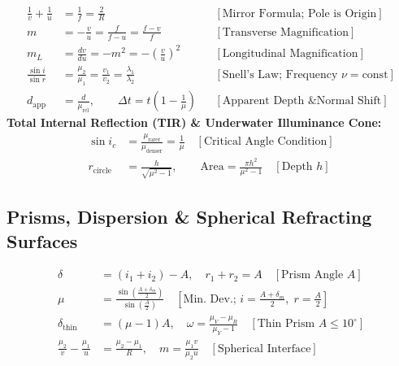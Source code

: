 \documentclass[10pt,twoside,openright]{book}
\begin{document}
\begin{formulabox}
\begin{align}
  \frac{1}{v} + \frac{1}{u} &= \frac{1}{f} = \frac{2}{R} && [\text{Mirror Formula; Pole is Origin}] \\
  m &= -\frac{v}{u} = \frac{f}{f - u} = \frac{f - v}{f} && [\text{Transverse Magnification}] \\
  m_L &= \frac{dv}{du} = -m^2 = -\left(\frac{v}{u}\right)^2 && [\text{Longitudinal Magnification}] \\
  \frac{\sin i}{\sin r} &= \frac{\mu_2}{\mu_1} = \frac{v_1}{v_2} = \frac{\lambda_1}{\lambda_2} && [\text{Snell's Law; Frequency } \nu = \text{const}] \\
  d_{\text{app}} &= \frac{d}{\mu_{\text{rel}}}, \qquad \Delta t = t\left(1 - \frac{1}{\mu}\right) && [\text{Apparent Depth \& Normal Shift}]
\end{align}
\textbf{Total Internal Reflection (TIR) \& Underwater Illuminance Cone:}
\begin{align}
  \sin i_c &= \frac{\mu_{\text{rarer}}}{\mu_{\text{denser}}} = \frac{1}{\mu} \quad [\text{Critical Angle Condition}] \\
  r_{\text{circle}} &= \frac{h}{\sqrt{\mu^2 - 1}}, \qquad \text{Area} = \frac{\pi h^2}{\mu^2 - 1} \quad [\text{Depth } h]
\end{align}
\end{formulabox}

\subsection{Prisms, Dispersion \& Spherical Refracting Surfaces}

\begin{formulabox}
\begin{align}
  \delta &= (i_1 + i_2) - A, \quad r_1 + r_2 = A \quad [\text{Prism Angle } A] \\
  \mu &= \frac{\sin\left(\frac{A + \delta_m}{2}\right)}{\sin\left(\frac{A}{2}\right)} \quad [\text{Min.\ Dev.; } i = \tfrac{A+\delta_m}{2},\; r = \tfrac{A}{2}] \\
  \delta_{\text{thin}} &= (\mu - 1)A, \quad \omega = \frac{\mu_V - \mu_R}{\mu_Y - 1} \quad [\text{Thin Prism } A \le 10^\circ] \\
  \frac{\mu_2}{v} - \frac{\mu_1}{u} &= \frac{\mu_2 - \mu_1}{R}, \quad m = \frac{\mu_1 v}{\mu_2 u} \quad [\text{Spherical Interface}]
\end{align}
\end{formulabox}
\end{document}
